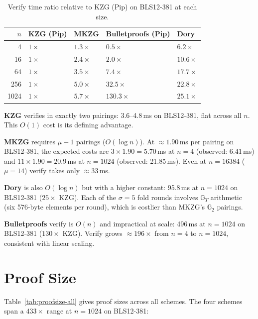\begin{table}[H]
\centering
\caption{Verify time ratio relative to KZG (Pip) on BLS12-381 at each size.}
\label{tab:verify-ratio}
\begin{tabular}{rllll}
\toprule
$n$ & \textbf{KZG (Pip)} & \textbf{MKZG} & \textbf{Bulletproofs (Pip)} & \textbf{Dory} \\
\midrule
4    & $1\times$ & $1.3\times$  & $0.5\times$  & $6.2\times$  \\
16   & $1\times$ & $2.4\times$  & $2.0\times$  & $10.6\times$ \\
64   & $1\times$ & $3.5\times$  & $7.4\times$  & $17.7\times$ \\
256  & $1\times$ & $5.0\times$  & $32.5\times$ & $22.8\times$ \\
1024 & $1\times$ & $5.7\times$  & $130.3\times$ & $25.1\times$ \\
\bottomrule
\end{tabular}
\end{table}

\textbf{KZG} verifies in exactly two pairings: 3.6--4.8\,ms on
BLS12-381, flat across all $n$. This $O(1)$ cost is its defining
advantage.

\textbf{MKZG} requires $\mu + 1$ pairings ($O(\log n)$). At
$\approx 1.90$\,ms per pairing on BLS12-381, the expected costs are
$3 \times 1.90 = 5.70$\,ms at $n = 4$ (observed: 6.41\,ms) and
$11 \times 1.90 = 20.9$\,ms at $n = 1024$ (observed: 21.85\,ms).
Even at $n = 16384$ ($\mu = 14$) verify takes only $\approx$33\,ms.

\textbf{Dory} is also $O(\log n)$ but with a higher constant: 95.8\,ms
at $n = 1024$ on BLS12-381 ($25\times$ KZG). Each of the $\sigma = 5$
fold rounds involves $\mathbb{G}_T$ arithmetic (six 576-byte elements
per round), which is costlier than MKZG's $\mathbb{G}_2$ pairings.

\textbf{Bulletproofs} verify is $O(n)$ and impractical at scale:
496\,ms at $n = 1024$ on BLS12-381 ($130\times$ KZG). Verify grows
$\approx 196\times$ from $n = 4$ to $n = 1024$, consistent with
linear scaling.


\section{Proof Size}
\label{sec:proofsize-comparison}

Table~\ref{tab:proofsize-all} gives proof sizes across all schemes.
The four schemes span a $433\times$ range at $n = 1024$ on BLS12-381:


